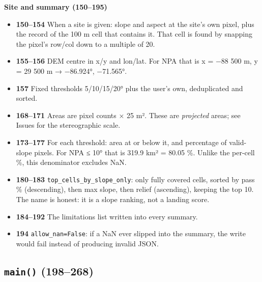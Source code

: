 \documentclass[11pt,a4paper]{article}
\providecommand{\tightlist}{\setlength{\itemsep}{0pt}\setlength{\parskip}{0pt}}
\begin{document}
\textbf{Site and summary (150--195)}

\begin{itemize}
\tightlist
\item
  \textbf{150--154} When a site is given: slope and aspect at the site's
  own pixel, plus the record of the 100 m cell that contains it. That
  cell is found by snapping the pixel's row/col down to a multiple of
  20.
\item
  \textbf{155--156} DEM centre in x/y and lon/lat. For NPA that is x =
  −88 500 m, y = 29 500 m → −86.924°, −71.565°.
\item
  \textbf{157} Fixed thresholds 5/10/15/20° plus the user's own,
  deduplicated and sorted.
\item
  \textbf{168--171} Areas are pixel counts × 25 m². These are
  \emph{projected} areas; see Issues for the stereographic scale.
\item
  \textbf{173--177} For each threshold: area at or below it, and
  percentage of valid-slope pixels. For NPA ≤ 10° that is 319.9 km² =
  80.05 \%. Unlike the per-cell \%, this denominator excludes NaN.
\item
  \textbf{180--183}
  \texttt{top\_cells\_by\_slope\_only}: only fully
  covered cells, sorted by pass \% (descending), then max slope, then
  relief (ascending), keeping the top 10. The name is honest: it is a
  slope ranking, not a landing score.
\item
  \textbf{184--192} The limitations list written into every summary.
\item
  \textbf{194} \texttt{allow\_nan=False}: if a NaN ever
  slipped into the summary, the write would fail instead of producing
  invalid JSON.
\end{itemize}

\hypertarget{main-198268}{%
\subsection{\texorpdfstring{\texttt{main()}
(198--268)}{main() (198--268)}}\label{main-198268}}
\end{document}
